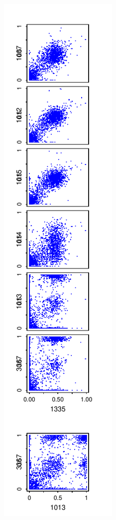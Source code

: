 \documentclass{article}\usepackage[]{graphicx}\usepackage[]{color}
\begin{document}
\noindent%
\includegraphics{Fig1-mscat-figs/6+1julie0F.pdf}%
\end{document}
